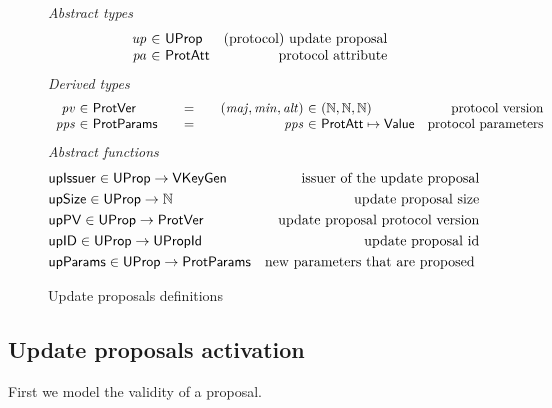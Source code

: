 \begin{figure}[htb]
  \emph{Abstract types}
  \begin{equation*}
    \begin{array}{r@{~\in~}lr}
      \var{up} & \UProp & \text{(protocol) update proposal}\\
      \var{pa} & \ProtAtt & \text{protocol attribute}\\
    \end{array}
  \end{equation*}
  \emph{Derived types}
  \begin{equation*}
    \begin{array}{r@{~\in~}l@{\qquad=\qquad}r@{~\in~}lr}
      \var{pv} & \ProtVer & (\var{maj}, \var{min}, \var{alt})
      & (\mathbb{N}, \mathbb{N}, \mathbb{N}) & \text{protocol version}\\
      \var{pps} & \ProtParams & \var{pps} & \ProtAtt \mapsto \Value & \text{protocol parameters}
    \end{array}
  \end{equation*}
  \emph{Abstract functions}
  \begin{align*}
    & \mathsf{upIssuer} \in \mathsf{UProp} \to \mathsf{VKeyGen} & \text{issuer of the update proposal}\\
    & \mathsf{upSize} \in \mathsf{UProp} \to \mathbb{N} & \text{update proposal size}\\
    & \mathsf{upPV} \in \mathsf{UProp} \to \mathbb{\mathsf{ProtVer}} & \text{update proposal protocol version}\\
    & \mathsf{upID} \in \mathsf{UProp} \to \mathbb{\mathsf{UPropId}} & \text{update proposal id}\\
    & \mathsf{upParams} \in \mathsf{UProp} \to \mathbb{\mathsf{ProtParams}}
                                             & \text{new parameters that are proposed }
  \end{align*}
  \caption{Update proposals definitions}
  \label{fig:defs:update-proposals}
\end{figure}

\subsection{Update proposals activation}
\label{sec:update-proposals-activation}

First we model the validity of a proposal.

